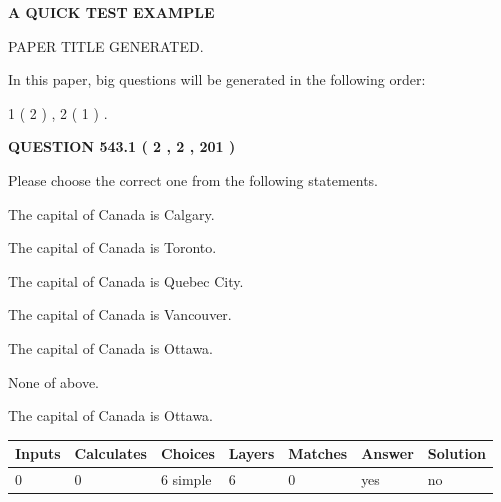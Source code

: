 \documentclass[12pt]{article}
\begin{document}
   
   
   
   
   
 \vspace{0.2in}
{\LARGE {\textbf{ A QUICK TEST EXAMPLE}}}
   
   
 PAPER TITLE GENERATED.
   
   
   
\vspace{0.2in}
   
In this paper, big questions will be generated in the following order: 
   
   
   1 ( 2 )
 ,
   2 ( 1 )
 .
  
\vspace{0.2in}
  
{\textbf{\Large{QUESTION
543.1 
 ( 2 , 2 , 201 )
}}}
  
  
Please choose the correct one from the following statements.
 
 
The capital of Canada is Calgary.
 
 
The capital of Canada is Toronto.
 
 
The capital of Canada is Quebec City.
 
 
The capital of Canada is Vancouver.
 
 
The capital of Canada is Ottawa.
 
 
 None of above.
 
 
\noindent{}
 
 
The capital of Canada is Ottawa.
 
 
\noindent{}
 
 
   
   
   
   
\noindent\begin{tabular}{|l|l|l|l|l|l|l|}
 \hline
Inputs & Calculates & Choices & Layers & Matches & Answer & Solution \\ \hline
 0  & 
 0  & 
 6
  simple  
  & 
 6  & 
 0  & 
  yes & 
  no 
  \\ \hline
 \end{tabular}
   
   
   
\end{document}
